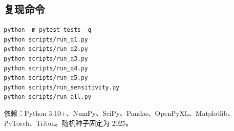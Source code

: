 \documentclass[11pt,a4paper]{ctexart}
\begin{document}
\subsection{复现命令}

\begin{verbatim}
python -m pytest tests -q
python scripts/run_q1.py
python scripts/run_q2.py
python scripts/run_q3.py
python scripts/run_q4.py
python scripts/run_q5.py
python scripts/run_sensitivity.py
python scripts/run_all.py
\end{verbatim}

依赖：Python 3.10+、NumPy、SciPy、Pandas、OpenPyXL、Matplotlib、PyTorch、Triton。随机种子固定为 2025。
\end{document}
